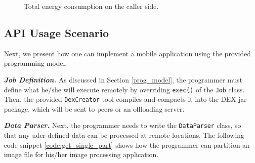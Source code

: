 \documentclass{sig-alternate}
\begin{document}
\begin{figure}
	\hspace*{-0.15cm}
	\caption{Total energy consumption on the caller side.}
	\label{fig:microb_24}
\end{figure}


\subsection{API Usage Scenario}
\label{sec:apiusage}
Next, we present how one can implement a mobile application using the provided programming model.

\textbf{\emph{Job Definition.}} As discussed in Section \ref{prog_model}, the programmer must define what he/she will execute remotely by overriding \texttt{exec()} of the \texttt{Job} class. Then, the provided \texttt{DexCreator} tool compiles and compacts it into the DEX jar package, which will be sent to peers or an offloading server. 



\textbf{\emph{Data Parser.}} Next, the programmer needs to write the \texttt{DataParser} class, so that any uder-defined data can be processed at remote locations. The following code snippet \ref{code:get_single_part} shows how the programmer can partition an image file for his/her image processing application.
\end{document}
